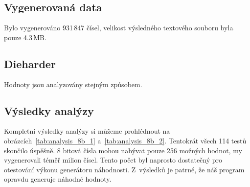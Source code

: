 \documentclass[11pt, a4paper, titlepage]{article}
\begin{document}
\subsection{Vygenerovaná data}

Bylo vygenerováno 931\,847 čísel, velikost výsledného textového souboru byla pouze 4.3\,MB.


\subsection{Dieharder}
Hodnoty jsou analyzovány stejným způsobem.

\begin{framed}
\end{framed}

\subsection{Výsledky analýzy}
Kompletní výsledky analýzy si můžeme prohlédnout na obrázcích~\ref{tab:analysis_8b_1} a~\ref{tab:analysis_8b_2}. Tentokrát všech 114 testů skončilo úspěšně. 8 bitová čísla mohou nabývat pouze 256 možných hodnot, my vygenerovali téměř milion čísel. Tento počet byl naprosto dostatečný pro otestování výkonu generátoru náhodnosti. Z~výsledků je patrné, že náš program opravdu generuje náhodné hodnoty.


\newpage
\end{document}
